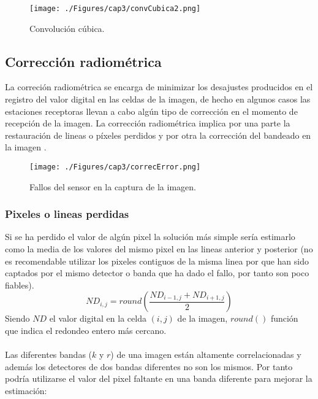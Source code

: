 \begin{itemize}
		    \begin{figure}[H]
		    	\centering
		    	\texttt{[image: ./Figures/cap3/convCubica2.png]}
		    	\caption{Convoluci\'on c\'ubica.}
		    	\label{fig:convCubica2}
		    \end{figure}
	\end{itemize}


\subsection{Correcci\'on radiom\'etrica}
La correci\'on radiom\'etrica se encarga de minimizar los desajustes producidos en el registro del valor digital en las celdas de la imagen, de hecho en algunos casos las estaciones receptoras llevan a cabo alg\'un tipo de correcci\'on en el momento de recepci\'on de la imagen. La corrección radiom\'etrica implica por una parte la restauraci\'on de lineas o p\'ixeles perdidos y por otra la correcci\'on del bandeado en la imagen \cite{teledUm}.
    \begin{figure}[H]
    	\centering
    	\texttt{[image: ./Figures/cap3/correcError.png]}
    	\caption{Fallos del sensor en la captura de la imagen.}
    	\label{fig:correcError}
    \end{figure}

\subsubsection{Pixeles o lineas perdidas}\label{subsec:pixelesP}
Si se ha perdido el valor de alg\'un pixel la solución m\'as simple ser\'ia estimarlo como la media de los valores
del mismo pixel en las lineas anterior y posterior (no es recomendable utilizar los pixeles contiguos de la misma linea por que han sido captados por el mismo detector o banda que ha dado el fallo, por tanto son
poco fiables).
		\begin{equation}
		ND_{i,j} = round(\dfrac{ND_{i-1,j} + ND_{i+1,j}}{2})
		\end{equation} 
Siendo $ ND $ el valor digital en la celda $ (i,j) $ de la imagen, $ round() $ funci\'on que indica el redondeo entero m\'as cercano.\\~\\
Las diferentes bandas ($ k $ y $ r $) de una imagen están altamente correlacionadas y adem\'as los detectores de dos bandas diferentes no son los mismos. Por tanto podría utilizarse el valor del pixel faltante en una banda diferente para mejorar la estimaci\'on:

